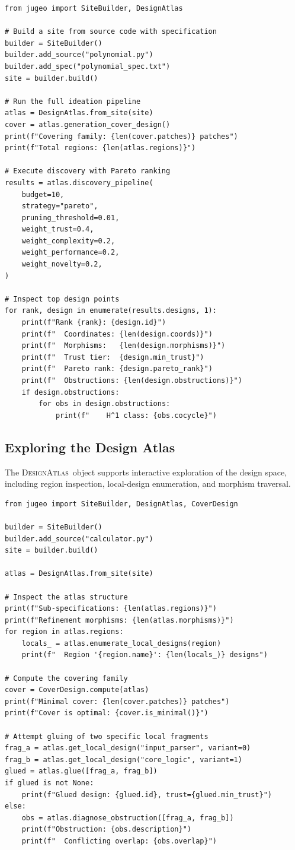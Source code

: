 \documentclass[11pt]{article}
\newcommand{\DesignAtlas}{\textsc{DesignAtlas}}
\begin{document}
\begin{lstlisting}[style=jugeo-python]
from jugeo import SiteBuilder, DesignAtlas

# Build a site from source code with specification
builder = SiteBuilder()
builder.add_source("polynomial.py")
builder.add_spec("polynomial_spec.txt")
site = builder.build()

# Run the full ideation pipeline
atlas = DesignAtlas.from_site(site)
cover = atlas.generation_cover_design()
print(f"Covering family: {len(cover.patches)} patches")
print(f"Total regions: {len(atlas.regions)}")

# Execute discovery with Pareto ranking
results = atlas.discovery_pipeline(
    budget=10,
    strategy="pareto",
    pruning_threshold=0.01,
    weight_trust=0.4,
    weight_complexity=0.2,
    weight_performance=0.2,
    weight_novelty=0.2,
)

# Inspect top design points
for rank, design in enumerate(results.designs, 1):
    print(f"Rank {rank}: {design.id}")
    print(f"  Coordinates: {len(design.coords)}")
    print(f"  Morphisms:   {len(design.morphisms)}")
    print(f"  Trust tier:  {design.min_trust}")
    print(f"  Pareto rank: {design.pareto_rank}")
    print(f"  Obstructions: {len(design.obstructions)}")
    if design.obstructions:
        for obs in design.obstructions:
            print(f"    H^1 class: {obs.cocycle}")
\end{lstlisting}

\subsection{Exploring the Design Atlas}

The \DesignAtlas\ object supports interactive exploration of the
design space, including region inspection, local-design enumeration,
and morphism traversal.

\begin{lstlisting}[style=jugeo-python]
from jugeo import SiteBuilder, DesignAtlas, CoverDesign

builder = SiteBuilder()
builder.add_source("calculator.py")
site = builder.build()

atlas = DesignAtlas.from_site(site)

# Inspect the atlas structure
print(f"Sub-specifications: {len(atlas.regions)}")
print(f"Refinement morphisms: {len(atlas.morphisms)}")
for region in atlas.regions:
    locals_ = atlas.enumerate_local_designs(region)
    print(f"  Region '{region.name}': {len(locals_)} designs")

# Compute the covering family
cover = CoverDesign.compute(atlas)
print(f"Minimal cover: {len(cover.patches)} patches")
print(f"Cover is optimal: {cover.is_minimal()}")

# Attempt gluing of two specific local fragments
frag_a = atlas.get_local_design("input_parser", variant=0)
frag_b = atlas.get_local_design("core_logic", variant=1)
glued = atlas.glue([frag_a, frag_b])
if glued is not None:
    print(f"Glued design: {glued.id}, trust={glued.min_trust}")
else:
    obs = atlas.diagnose_obstruction([frag_a, frag_b])
    print(f"Obstruction: {obs.description}")
    print(f"  Conflicting overlap: {obs.overlap}")
\end{lstlisting}
\end{document}
